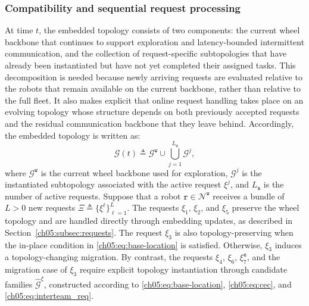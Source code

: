 \subsubsection{Compatibility and sequential request processing}
\label{ch05:subsubsec:multi_req}

At time \(t\), the embedded topology consists of two components: the
current wheel backbone that continues to support exploration and
latency-bounded intermittent communication, and the collection of
request-specific subtopologies that have already been instantiated but
have not yet completed their assigned tasks. This decomposition is
needed because newly arriving requests are evaluated relative to the
robots that remain available on the current backbone, rather than
relative to the full fleet. It also makes explicit that online request
handling takes place on an evolving topology whose structure depends on
both previously accepted requests and the residual communication
backbone that they leave behind. Accordingly, the embedded topology is
written as:
\begin{equation}
\label{ch05:eq:decomposition}
\mathcal{G}(t) \triangleq
\mathcal{G}^{\texttt{w}}
\cup
\bigcup_{j=1}^{L_{\texttt{a}}}\mathcal{G}^{j},
\end{equation}
where \(\mathcal{G}^{\texttt{w}}\) is the current wheel backbone used
for exploration, \(\mathcal{G}^{j}\) is the instantiated subtopology
associated with the active request \(\xi^{j}\), and
\(L_{\texttt{a}}\) is the number of active requests.
Suppose that a robot
\(\texttt{r}\in\mathcal{N}^{\texttt{w}}\) receives a bundle of
\(L>0\) new requests
\(\Xi \triangleq \{\xi^{\ell}\}_{\ell=1}^{L}\). The requests
\(\xi_1\), \(\xi_2\), and \(\xi_5\) preserve the wheel topology
and are handled directly through embedding updates, as described in
Section~\ref{ch05:subsec:requests}. The request \(\xi_3\) is
also topology-preserving when the in-place condition in
\eqref{ch05:eq:base-location} is satisfied. Otherwise, \(\xi_3\)
induces a topology-changing migration. By contrast, the requests
\(\xi_4\), \(\xi_6\), \(\xi_7^{\texttt{e}}\), and the migration case of
\(\xi_3\) require explicit topology instantiation through candidate
families \(\widehat{\mathcal{G}}^{\xi}\), constructed according to
\eqref{ch05:eq:base-location}, \eqref{ch05:eq:cec}, and
\eqref{ch05:eq:interteam_req}.

